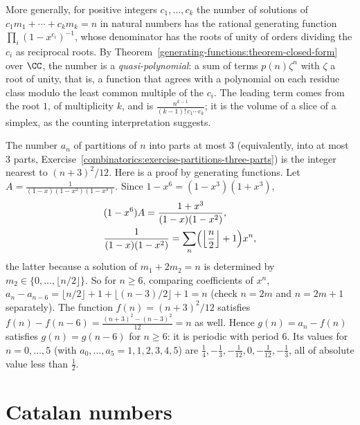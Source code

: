 More generally, for positive integers $c_1, \ldots, c_k$ the number of solutions of $c_1m_1 + \cdots + c_km_k = n$ in natural numbers has the rational generating function $\prod_i(1 - x^{c_i})^{-1}$,
whose denominator has the roots of unity of orders dividing the $c_i$ as reciprocal roots. By Theorem~\ref{generating-functions:theorem-closed-form} over $\CC$, the number is a \emph{quasi-polynomial}:
a sum of terms $p(n)\zeta^n$ with $\zeta$ a root of unity, that is, a function that agrees with a polynomial on each residue class modulo the least common multiple of the $c_i$. The leading term
comes from the root $1$, of multiplicity $k$, and is $\frac{n^{k-1}}{(k - 1)!\,c_1 \cdots c_k}$; it is the volume of a slice of a simplex, as the counting interpretation suggests.

\begin{example}\label{generating-functions:example-three-parts}
The number $a_n$ of partitions of $n$ into parts at most $3$ (equivalently, into at most $3$ parts, Exercise~\ref{combinatorics:exercise-partitions-three-parts}) is the integer nearest to
$(n + 3)^2/12$. Here is a proof by generating functions. Let $A = \frac{1}{(1 - x)(1 - x^2)(1 - x^3)}$. Since $1 - x^6 = (1 - x^3)(1 + x^3)$,
\[
\begin{aligned}
&(1 - x^6)A = \frac{1 + x^3}{(1 - x)(1 - x^2)},\\
&\frac{1}{(1 - x)(1 - x^2)} = \sum_n\Bigl(\Bigl\lfloor\frac{n}{2}\Bigr\rfloor + 1\Bigr)x^n,
\end{aligned}
\]
the latter because a solution of $m_1 + 2m_2 = n$ is determined by $m_2 \in \{0, \ldots, \lfloor n/2\rfloor\}$. So for $n \geq 6$, comparing coefficients of $x^n$, $a_n - a_{n-6} = \lfloor n/2\rfloor + 1 + \lfloor(n - 3)/2\rfloor + 1 = n$ (check $n = 2m$ and $n = 2m + 1$ separately). The function
$f(n) = (n + 3)^2/12$ satisfies $f(n) - f(n - 6) = \frac{(n + 3)^2 - (n - 3)^2}{12} = n$ as well. Hence $g(n) = a_n - f(n)$ satisfies $g(n) = g(n - 6)$ for $n \geq 6$: it is periodic with period $6$.
Its values for $n = 0, \ldots, 5$ (with $a_0, \ldots, a_5 = 1, 1, 2, 3, 4, 5$) are $\frac14, -\frac13, -\frac1{12}, 0, -\frac1{12}, -\frac13$, all of absolute value less than $\frac12$.
\end{example}

\section{Catalan numbers}\label{generating-functions:section-catalan}

